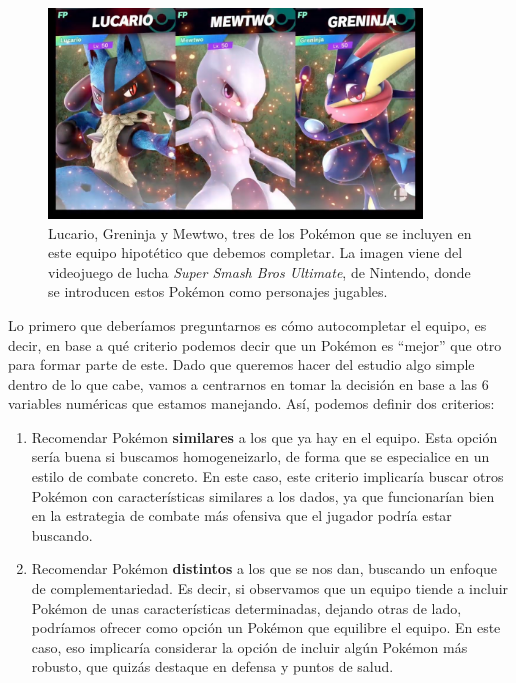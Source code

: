 \documentclass[
  12pt,
]{extreport}
\begin{document}
\begin{figure}[H]

{\centering \includegraphics[width=3.90625in,height=\textheight]{trabajo_images/lucario_gren_mewtwo.jpg}

}

\caption{Lucario, Greninja y Mewtwo, tres de los Pokémon que se incluyen
en este equipo hipotético que debemos completar. La imagen viene del
videojuego de lucha \emph{Super Smash Bros Ultimate}, de Nintendo, donde
se introducen estos Pokémon como personajes jugables.}

\end{figure}%

Lo primero que deberíamos preguntarnos es cómo autocompletar el equipo,
es decir, en base a qué criterio podemos decir que un Pokémon es
``mejor'' que otro para formar parte de este. Dado que queremos hacer
del estudio algo simple dentro de lo que cabe, vamos a centrarnos en
tomar la decisión en base a las 6 variables numéricas que estamos
manejando. Así, podemos definir dos criterios:

\begin{enumerate}
\def\labelenumi{\arabic{enumi}.}
\item
  Recomendar Pokémon \textbf{similares} a los que ya hay en el equipo.
  Esta opción sería buena si buscamos homogeneizarlo, de forma que se
  especialice en un estilo de combate concreto. En este caso, este
  criterio implicaría buscar otros Pokémon con características similares
  a los dados, ya que funcionarían bien en la estrategia de combate más
  ofensiva que el jugador podría estar buscando.
\item
  Recomendar Pokémon \textbf{distintos} a los que se nos dan, buscando
  un enfoque de complementariedad. Es decir, si observamos que un equipo
  tiende a incluir Pokémon de unas características determinadas, dejando
  otras de lado, podríamos ofrecer como opción un Pokémon que equilibre
  el equipo. En este caso, eso implicaría considerar la opción de
  incluir algún Pokémon más robusto, que quizás destaque en defensa y
  puntos de salud.
\end{enumerate}
\end{document}
